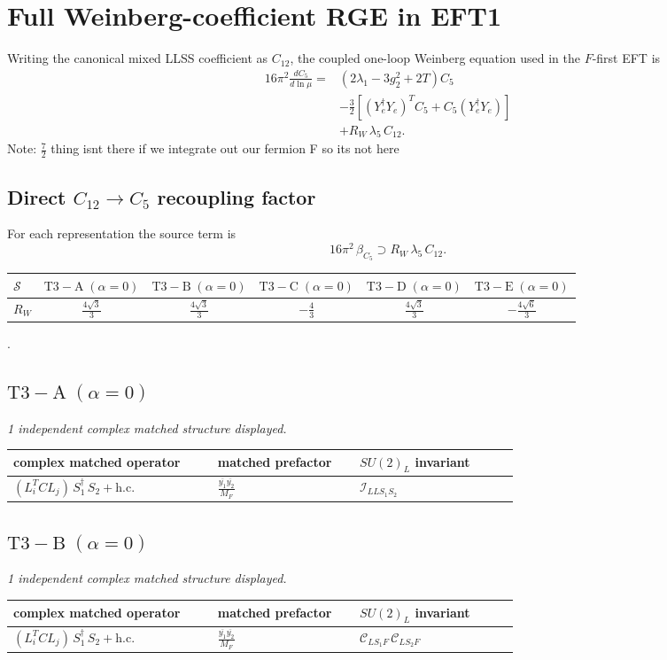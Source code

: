 \documentclass[9pt]{article}
\begin{document}
\section*{Full Weinberg-coefficient RGE in EFT1}
Writing the canonical mixed LLSS coefficient as $C_{12}$, the coupled one-loop Weinberg equation used in the $F$-first EFT is
\begin{align}
16\pi^2\frac{dC_5}{d\ln\mu}={}&(2\lambda_1-3g_2^2+2T)C_5\\
&-\frac32\left[(Y_e^\dagger Y_e)^T C_5+C_5(Y_e^\dagger Y_e)\right]\\
&+R_W\,\lambda_5\,C_{12}.
\end{align}
Note: $\frac{7}{2}$ thing isnt there if we integrate out our fermion F so its not here \subsection*{Direct $C_{12}\to C_5$ recoupling factor}
For each representation the source term is
\[16\pi^2\,\beta_{C_5}\supset R_W\,\lambda_5\,C_{12}.\]
\begin{longtable}{@{}lccccc@{}}
\toprule
$\mathcal{S}$ & $ \mathrm{T3-A}\;(\alpha=0) $ & $ \mathrm{T3-B}\;(\alpha=0) $ & $ \mathrm{T3-C}\;(\alpha=0) $ & $ \mathrm{T3-D}\;(\alpha=0) $ & $ \mathrm{T3-E}\;(\alpha=0) $ \\
\midrule
$R_W$ & $ \frac{4 \sqrt{3}}{3} $ & $ \frac{4 \sqrt{3}}{3} $ & $ - \frac{4}{3} $ & $ \frac{4 \sqrt{3}}{3} $ & $ - \frac{4 \sqrt{6}}{3} $ \\
\bottomrule
\end{longtable}
.
\subsection*{$ \mathrm{T3-A}\;(\alpha=0) $}
\textit{1 independent complex matched structure displayed. }
\begin{longtable}{@{}p{0.36\linewidth}p{0.25\linewidth}p{0.29\linewidth}@{}}
\toprule
complex matched operator & matched prefactor & $SU(2)_L$ invariant \\
\midrule
$ (L_i^T C L_j)\,S_1^\dagger\,S_2+\mathrm{h.c.} $ & $ \frac{\overline{y_{1}} \overline{y_{2}}}{M_F} $ & $ \mathcal{I}_{LLS_1S_2} $ \\
\bottomrule
\end{longtable}
\subsection*{$ \mathrm{T3-B}\;(\alpha=0) $}
\textit{1 independent complex matched structure displayed. }
\begin{longtable}{@{}p{0.36\linewidth}p{0.25\linewidth}p{0.29\linewidth}@{}}
\toprule
complex matched operator & matched prefactor & $SU(2)_L$ invariant \\
\midrule
$ (L_i^T C L_j)\,S_1^\dagger\,S_2+\mathrm{h.c.} $ & $ \frac{\overline{y_{1}} \overline{y_{2}}}{M_F} $ & $ \mathcal{C}_{LS_1F}\,\mathcal{C}_{LS_2F} $ \\
\bottomrule
\end{longtable}
\end{document}
